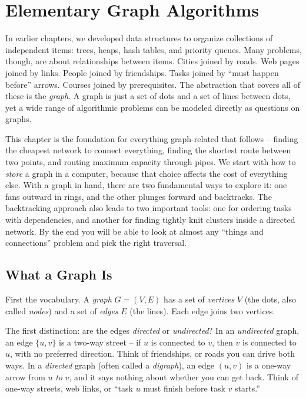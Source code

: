 \chapter{Elementary Graph Algorithms}

In earlier chapters, we developed data structures to organize collections of independent items: trees, heaps, hash tables, and priority queues. Many problems, though, are about relationships between items. Cities joined by roads. Web pages joined by links. People joined by friendships. Tasks joined by ``must happen before'' arrows. Courses joined by prerequisites. The abstraction that covers all of these is the \emph{graph}. A graph is just a set of dots and a set of lines between dots, yet a wide range of algorithmic problems can be modeled directly as questions on graphs.

This chapter is the foundation for everything graph-related that follows -- finding the cheapest network to connect everything, finding the shortest route between two points, and routing maximum capacity through pipes. We start with how to \emph{store} a graph in a computer, because that choice affects the cost of everything else. With a graph in hand, there are two fundamental ways to explore it: one fans outward in rings, and the other plunges forward and backtracks. The backtracking approach also leads to two important tools: one for ordering tasks with dependencies, and another for finding tightly knit clusters inside a directed network. By the end you will be able to look at almost any ``things and connections'' problem and pick the right traversal.

\chapterline

\section{What a Graph Is}
\label{ch22:what-is-a-graph}

First the vocabulary. A \emph{graph} $G = (V, E)$ has a set of
\emph{vertices} $V$ (the dots, also called \emph{nodes}) and a set of
\emph{edges} $E$ (the lines). Each edge joins two vertices.

The first distinction: are the edges \emph{directed} or
\emph{undirected}? In an \emph{undirected} graph, an edge $\{u, v\}$ is a
two-way street -- if $u$ is connected to $v$, then $v$ is connected to $u$, with
no preferred direction. Think of friendships, or roads you can drive both ways.
In a \emph{directed} graph (often called a \emph{digraph}), an edge $(u, v)$ is
a one-way arrow from $u$ \emph{to} $v$, and it says nothing about whether you
can get back. Think of one-way streets, web links, or ``task $u$ must finish
before task $v$ starts.''

